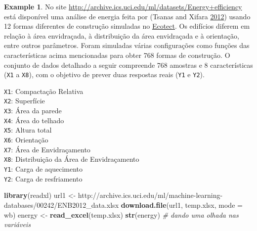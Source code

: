 \documentclass[
]{book}
\newenvironment{Shaded}{\begin{snugshade}}{\end{snugshade}}
\newcommand{\CommentTok}[1]{\textcolor[rgb]{0.56,0.35,0.01}{\textit{#1}}}
\newcommand{\DataTypeTok}[1]{\textcolor[rgb]{0.13,0.29,0.53}{#1}}
\newcommand{\KeywordTok}[1]{\textcolor[rgb]{0.13,0.29,0.53}{\textbf{#1}}}
\newcommand{\NormalTok}[1]{#1}
\newcommand{\StringTok}[1]{\textcolor[rgb]{0.31,0.60,0.02}{#1}}
\theoremstyle{definition}
\theoremstyle{definition}
\newtheorem{example}{Example}[chapter]
\theoremstyle{definition}
\theoremstyle{remark}
\begin{document}
\begin{example}
\protect\hypertarget{exm:unnamed-chunk-128}{}{\label{exm:unnamed-chunk-128} }No site \url{http://archive.ics.uci.edu/ml/datasets/Energy+efficiency} está disponível uma análise de energia feita por (Tsanas and Xifara \protect\hyperlink{ref-tsanas2012accurate}{2012}) usando 12 formas diferentes de construção simuladas no \href{https://en.wikipedia.org/wiki/Autodesk_Ecotect_Analysis}{Ecotect}. Os edifícios diferem em relação à área envidraçada, à distribuição da área envidraçada e à orientação, entre outros parâmetros. Foram simuladas várias configurações como funções das características acima mencionadas para obter 768 formas de construção. O conjunto de dados detalhado a seguir compreende 768 amostras e 8 características (\texttt{X1} a \texttt{X8}), com o objetivo de prever duas respostas reais (\texttt{Y1} e \texttt{Y2}).

\texttt{X1}: Compactação Relativa\\
\texttt{X2}: Superfície\\
\texttt{X3}: Área da parede\\
\texttt{X4}: Área do telhado\\
\texttt{X5}: Altura total\\
\texttt{X6}: Orientação\\
\texttt{X7}: Área de Envidraçamento\\
\texttt{X8}: Distribuição da Área de Envidraçamento\\
\texttt{Y1}: Carga de aquecimento\\
\texttt{Y2}: Carga de resfriamento\\
\end{example}

\begin{Shaded}
\begin{Highlighting}[]
\KeywordTok{library}\NormalTok{(readxl)}
\NormalTok{url1 \textless{}{-}}\StringTok{ \textquotesingle{}http://archive.ics.uci.edu/ml/machine{-}learning{-}databases/00242/ENB2012\_data.xlsx\textquotesingle{}}
\KeywordTok{download.file}\NormalTok{(url1, }\StringTok{\textquotesingle{}temp.xlsx\textquotesingle{}}\NormalTok{, }\DataTypeTok{mode =} \StringTok{\textquotesingle{}wb\textquotesingle{}}\NormalTok{)}
\NormalTok{energy \textless{}{-}}\StringTok{ }\KeywordTok{read\_excel}\NormalTok{(}\StringTok{\textquotesingle{}temp.xlsx\textquotesingle{}}\NormalTok{)}
\KeywordTok{str}\NormalTok{(energy)   }\CommentTok{\# dando uma olhada nas variáveis}
\end{Highlighting}
\end{Shaded}
\end{document}
